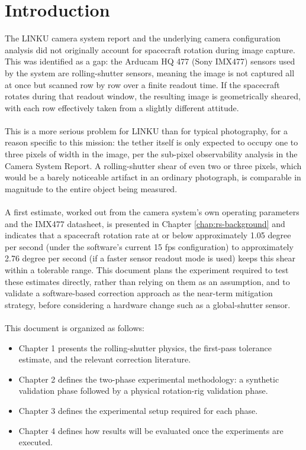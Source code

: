\chapter*{Introduction}

The LINKU camera system report and the underlying camera configuration analysis did not originally account for spacecraft rotation during image capture. This was identified as a gap: the Arducam HQ 477 (Sony IMX477) sensors used by the system are rolling-shutter sensors, meaning the image is not captured all at once but scanned row by row over a finite readout time. If the spacecraft rotates during that readout window, the resulting image is geometrically sheared, with each row effectively taken from a slightly different attitude.
\\\\
This is a more serious problem for LINKU than for typical photography, for a reason specific to this mission: the tether itself is only expected to occupy one to three pixels of width in the image, per the sub-pixel observability analysis in the Camera System Report. A rolling-shutter shear of even two or three pixels, which would be a barely noticeable artifact in an ordinary photograph, is comparable in magnitude to the entire object being measured.
\\\\
A first estimate, worked out from the camera system's own operating parameters and the IMX477 datasheet, is presented in Chapter \ref{chap:rs-background} and indicates that a spacecraft rotation rate at or below approximately 1.05 degree per second (under the software's current 15 fps configuration) to approximately 2.76 degree per second (if a faster sensor readout mode is used) keeps this shear within a tolerable range. This document plans the experiment required to test these estimates directly, rather than relying on them as an assumption, and to validate a software-based correction approach as the near-term mitigation strategy, before considering a hardware change such as a global-shutter sensor.
\\\\
This document is organized as follows:

\begin{itemize}
    \item Chapter 1 presents the rolling-shutter physics, the first-pass tolerance estimate, and the relevant correction literature.
    \item Chapter 2 defines the two-phase experimental methodology: a synthetic validation phase followed by a physical rotation-rig validation phase.
    \item Chapter 3 defines the experimental setup required for each phase.
    \item Chapter 4 defines how results will be evaluated once the experiments are executed.
\end{itemize}

